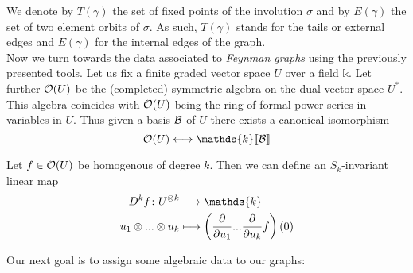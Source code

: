 We denote by $T(\gamma)$ the set of fixed points of the involution $\sigma$ and by $E(\gamma)$ the set of two element orbits of $\sigma$. As such, $T(\gamma)$ stands for the tails or external edges and $E(\gamma)$ for the internal edges of the graph.\\

Now we turn towards the data associated to \emph{Feynman graphs} using the previously presented tools. Let us fix a finite graded vector space $U$ over a field $\mathds{k}$. Let further $\mathcal{O}(U)$ be the (completed) symmetric algebra on the dual vector space $U^*$. This algebra coincides with $\mathcal{O}(U)$ being the ring of formal power series in variables in $U$. Thus given a basis $\mathcal{B}$ of $U$ there exists a canonical isomorphism
$$ \OO(U) \longleftrightarrow \mathds{k}\llbracket\BB\rrbracket $$

\begin{definition}
  Let $f \in \mathcal{O}(U)$ be homogenous of degree $k$. Then we can define an $S_k$-invariant linear map
  \begin{align}
    D^kf \colon U^{\otimes k} &\lra \mathds{k}\\
    u_1 \otimes ... \otimes u_k &\lmap \left( \dell{}{u_1} ... \dell{}{u_k} f \right) (0)
  \end{align}
\end{definition}

Our next goal is to assign some algebraic data to our graphs:

